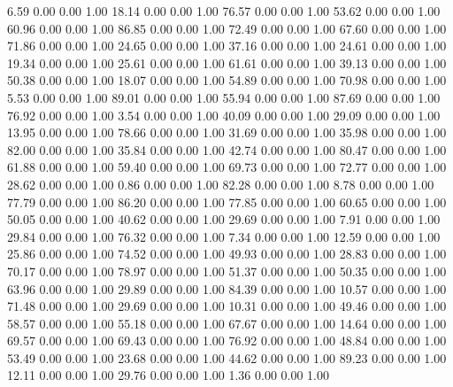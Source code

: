     6.59   0.00   0.00   1.00
   18.14   0.00   0.00   1.00
   76.57   0.00   0.00   1.00
   53.62   0.00   0.00   1.00
   60.96   0.00   0.00   1.00
   86.85   0.00   0.00   1.00
   72.49   0.00   0.00   1.00
   67.60   0.00   0.00   1.00
   71.86   0.00   0.00   1.00
   24.65   0.00   0.00   1.00
   37.16   0.00   0.00   1.00
   24.61   0.00   0.00   1.00
   19.34   0.00   0.00   1.00
   25.61   0.00   0.00   1.00
   61.61   0.00   0.00   1.00
   39.13   0.00   0.00   1.00
   50.38   0.00   0.00   1.00
   18.07   0.00   0.00   1.00
   54.89   0.00   0.00   1.00
   70.98   0.00   0.00   1.00
    5.53   0.00   0.00   1.00
   89.01   0.00   0.00   1.00
   55.94   0.00   0.00   1.00
   87.69   0.00   0.00   1.00
   76.92   0.00   0.00   1.00
    3.54   0.00   0.00   1.00
   40.09   0.00   0.00   1.00
   29.09   0.00   0.00   1.00
   13.95   0.00   0.00   1.00
   78.66   0.00   0.00   1.00
   31.69   0.00   0.00   1.00
   35.98   0.00   0.00   1.00
   82.00   0.00   0.00   1.00
   35.84   0.00   0.00   1.00
   42.74   0.00   0.00   1.00
   80.47   0.00   0.00   1.00
   61.88   0.00   0.00   1.00
   59.40   0.00   0.00   1.00
   69.73   0.00   0.00   1.00
   72.77   0.00   0.00   1.00
   28.62   0.00   0.00   1.00
    0.86   0.00   0.00   1.00
   82.28   0.00   0.00   1.00
    8.78   0.00   0.00   1.00
   77.79   0.00   0.00   1.00
   86.20   0.00   0.00   1.00
   77.85   0.00   0.00   1.00
   60.65   0.00   0.00   1.00
   50.05   0.00   0.00   1.00
   40.62   0.00   0.00   1.00
   29.69   0.00   0.00   1.00
    7.91   0.00   0.00   1.00
   29.84   0.00   0.00   1.00
   76.32   0.00   0.00   1.00
    7.34   0.00   0.00   1.00
   12.59   0.00   0.00   1.00
   25.86   0.00   0.00   1.00
   74.52   0.00   0.00   1.00
   49.93   0.00   0.00   1.00
   28.83   0.00   0.00   1.00
   70.17   0.00   0.00   1.00
   78.97   0.00   0.00   1.00
   51.37   0.00   0.00   1.00
   50.35   0.00   0.00   1.00
   63.96   0.00   0.00   1.00
   29.89   0.00   0.00   1.00
   84.39   0.00   0.00   1.00
   10.57   0.00   0.00   1.00
   71.48   0.00   0.00   1.00
   29.69   0.00   0.00   1.00
   10.31   0.00   0.00   1.00
   49.46   0.00   0.00   1.00
   58.57   0.00   0.00   1.00
   55.18   0.00   0.00   1.00
   67.67   0.00   0.00   1.00
   14.64   0.00   0.00   1.00
   69.57   0.00   0.00   1.00
   69.43   0.00   0.00   1.00
   76.92   0.00   0.00   1.00
   48.84   0.00   0.00   1.00
   53.49   0.00   0.00   1.00
   23.68   0.00   0.00   1.00
   44.62   0.00   0.00   1.00
   89.23   0.00   0.00   1.00
   12.11   0.00   0.00   1.00
   29.76   0.00   0.00   1.00
    1.36   0.00   0.00   1.00
